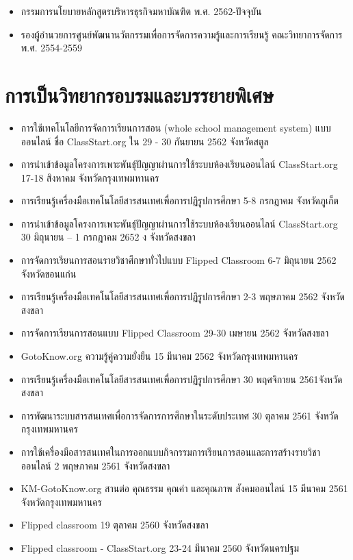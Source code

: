 \begin{appendices}
\begin{itemize}
	\item กรรมการนโยบายหลักสูตรบริหารธุรกิจมหาบัณฑิต พ.ศ. 2562-ปัจจุบัน 
	\item รองผู้อำนวยการศูนย์พัฒนานวัตกรรมเพื่อการจัดการความรู้และการเรียนรู้ คณะวิทยาการจัดการ  พ.ศ. 2554-2559 
\end{itemize}

\section*{การเป็นวิทยากรอบรมและบรรยายพิเศษ}

\begin{itemize}
	\item การใช้เทคโนโลยีการจัดการเรียนการสอน (whole school management system) แบบออนไลน์ ชื่อ ClassStart.org ใน 29 - 30 กันยายน 2562  จังหวัดสตูล
	\item การนำเข้าข้อมูลโครงการเพาะพันธุ์ปัญญาผ่านการใช้ระบบห้องเรียนออนไลน์ ClassStart.org 17-18 สิงหาคม  จังหวัดกรุงเทพมหานคร
	\item การเรียนรู้เครื่องมือเทคโนโลยีสารสนเทศเพื่อการปฏิรูปการศึกษา 5-8 กรกฎาคม  จังหวัดภูเก็ต
	\item การนำเข้าข้อมูลโครงการเพาะพันธุ์ปัญญาผ่านการใช้ระบบห้องเรียนออนไลน์ ClassStart.org 30 มิถุนายน – 1 กรกฎาคม 2652 ง จังหวัดสงขลา
	\item การจัดการเรียนการสอนรายวิชาศึกษาทั่วไปแบบ Flipped Classroom 6-7 มิถุนายน 2562  จังหวัดขอนแก่น
	\item การเรียนรู้เครื่องมือเทคโนโลยีสารสนเทศเพื่อการปฏิรูปการศึกษา 2-3 พฤษภาคม 2562  จังหวัดสงขลา
	\item การจัดการเรียนการสอนแบบ Flipped Classroom 29-30 เมษายน 2562  จังหวัดสงขลา
	\item GotoKnow.org ความรู้คู่ความยั่งยืน 15 มีนาคม 2562  จังหวัดกรุงเทพมหานคร
	\item การเรียนรู้เครื่องมือเทคโนโลยีสารสนเทศเพื่อการปฏิรูปการศึกษา 30 พฤศจิกายน 2561จังหวัดสงขลา
	\item การพัฒนาระบบสารสนเทศเพื่อการจัดการการศึกษาในระดับประเทศ 30 ตุลาคม 2561  จังหวัดกรุงเทพมหานคร
	\item การใช้เครื่องมือสารสนเทศในการออกแบบกิจกรรมการเรียนการสอนและการสร้างรายวิชาออนไลน์ 2 พฤษภาคม 2561 จังหวัดสงขลา
	\item KM-GotoKnow.org สานต่อ คุณธรรม คุณค่า และคุณภาพ สังคมออนไลน์ 15 มีนาคม 2561 จังหวัดกรุงเทพมหานคร
	\item Flipped classroom 19 ตุลาคม 2560  จังหวัดสงขลา
	\item Flipped classroom - ClassStart.org 23-24 มีนาคม 2560  จังหวัดนครปฐม

\end{itemize}
\end{appendices}
